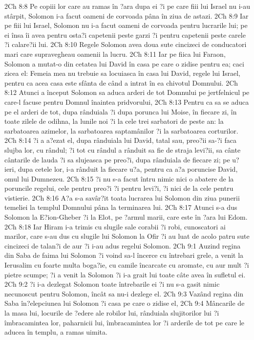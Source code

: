 2Ch 8:8  Pe copiii lor care au ramas în ?ara dupa ei ?i pe care fiii lui Israel nu i-au stârpit, Solomon i-a facut oameni de corvoada pâna în ziua de astazi.
2Ch 8:9  Iar pe fiii lui Israel, Solomon nu i-a facut oameni de corvoada pentru lucrarile lui; pe ei însa îi avea pentru osta?i capetenii peste garzi ?i pentru capetenii peste carele ?i calare?ii lui.
2Ch 8:10  Regele Solomon avea doua sute cincizeci de conducatori mari care supravegheau oamenii la lucru.
2Ch 8:11  Iar pe fiica lui Faraon, Solomon a mutat-o din cetatea lui David în casa pe care o zidise pentru ea; caci zicea el: Femeia mea nu trebuie sa locuiasca în casa lui David, regele lui Israel, pentru ca acea casa este sfânta de când a intrat în ea chivotul Domnului.
2Ch 8:12  Atunci a început Solomon sa aduca arderi de tot Domnului pe jertfelnicul pe care-l facuse pentru Domnul înaintea pridvorului,
2Ch 8:13  Pentru ca sa se aduca pe el arderi de tot, dupa rânduiala ?i dupa porunca lui Moise, în fiecare zi, în toate zilele de odihna, la lunile noi ?i la cele trei sarbatori de peste an: la sarbatoarea azimelor, la sarbatoarea saptamânilor ?i la sarbatoarea corturilor.
2Ch 8:14  ?i a a?ezat el, dupa rânduiala lui David, tatal sau, preo?ii sa-?i faca slujba lor, cu rândul; ?i tot cu rândul a rânduit sa fie de straja levi?ii, sa cânte cântarile de lauda ?i sa slujeasca pe preo?i, dupa rânduiala de fiecare zi; pe u?ieri, dupa cetele lor, i-a rânduit la fiecare u?a, pentru ca a?a poruncise David, omul lui Dumnezeu.
2Ch 8:15  ?i nu s-a facut întru nimic nici o abatere de la poruncile regelui, cele pentru preo?i ?i pentru levi?i, ?i nici de la cele pentru vistierie.
2Ch 8:16  A?a s-a savâr?it toata lucrarea lui Solomon din ziua punerii temeliei la templul Domnului pâna la terminarea lui.
2Ch 8:17  Atunci s-a dus Solomon la E?ion-Gheber ?i la Elot, pe ?armul marii, care este în ?ara lui Edom.
2Ch 8:18  Iar Hiram i-a trimis cu slugile sale corabii ?i robi, cunoscatori ai marilor, care s-au dus cu slugile lui Solomon la Ofir ?i au luat de acolo patru sute cincizeci de talan?i de aur ?i i-au adus regelui Solomon.
2Ch 9:1  Auzind regina din Saba de faima lui Solomon ?i voind sa-l încerce cu întrebari grele, a venit la Ierusalim cu foarte multa boga?ie, cu camile încarcate cu aromate, cu aur mult ?i pietre scumpe; ?i a venit la Solomon ?i i-a grait lui toate câte avea în sufletul ei.
2Ch 9:2  ?i i-a dezlegat Solomon toate întrebarile ei ?i nu s-a gasit nimic necunoscut pentru Solomon, încât sa nu-i dezlege el.
2Ch 9:3  Vazând regina din Saba în?elepciunea lui Solomon ?i casa pe care o zidise el,
2Ch 9:4  Mâncarile de la masa lui, locurile de ?edere ale robilor lui, rânduiala slujitorilor lui ?i îmbracamintea lor, paharnicii lui, îmbracamintea lor ?i arderile de tot pe care le aducea în templu, a ramas uimita.
